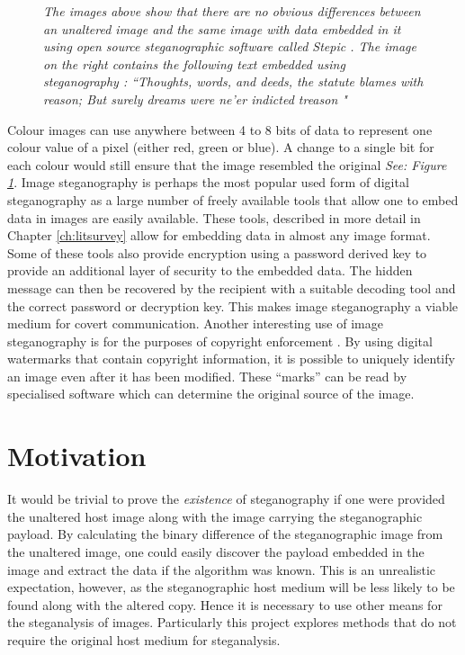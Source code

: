 \begin{figure}[h!]
\caption{\emph{The images above show that there are no obvious differences between an unaltered image and the same image with data embedded in it using open source steganographic software called Stepic \cite{stepnic}. The image on the right contains the following text embedded using steganography : ``Thoughts, words, and deeds, the statute blames with reason;  But surely dreams were ne'er indicted treason \cite{burns}"}}
\label{fig:stegexample}
\end{figure} 
Colour images can use anywhere between 4 to 8 bits of data to represent one colour value of a pixel (either red, green or blue). A change to a single bit for each colour would still ensure that the image resembled the original \emph{See: Figure \ref{fig:stegexample}}.
Image steganography is perhaps the most popular used form of digital steganography as a large number of freely available tools that allow one to embed data in images are easily available. These tools, described in more detail in Chapter \ref{ch:litsurvey} allow for embedding data in almost any image format. Some of these tools also provide encryption using a password derived key to provide an additional layer of security to the embedded data. The hidden message can then be recovered by the recipient with a suitable decoding tool and the correct password or decryption key. This makes image steganography a viable medium for covert communication.  
Another interesting use of image steganography is for the purposes of copyright enforcement  \cite{kundur2002digital}. By using digital watermarks that contain copyright information,  it is possible to uniquely identify an image even after it has  been modified. These ``marks'' can be read by specialised software which can determine the original source of the image.
\section{Motivation}
\label{sec:motivation}
It would be trivial to prove the \emph{existence} of steganography if one were provided the unaltered host image along with the image carrying the steganographic payload. By calculating the binary difference of the steganographic image from the unaltered image, one could easily discover the payload embedded in the image and extract the data if the algorithm was known. This is an unrealistic expectation, however,  as the steganographic host medium will be less likely to be found along with the altered copy. Hence it is necessary to use other means for the steganalysis of images. Particularly this project explores methods that do not require the original host medium for steganalysis.
